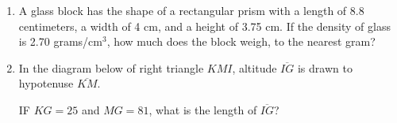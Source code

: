 \documentclass[12pt, oneside]{article}
\begin{document}
\begin{enumerate}[itemsep=2cm]
\item A glass block has the shape of a rectangular prism with a length of 8.8 centimeters, a width of 4 cm, and a height of 3.75 cm. If the density of glass is 2.70 grams/cm$^3$, how much does the block weigh, to the nearest gram?

\item In the diagram below of right triangle $KMI$, altitude $\overline{IG}$ is drawn to hypotenuse $\overline{KM}$.
  \begin{center}
  \end{center}
IF $KG=25$ and $MG=81$, what is the length of $\overline{IG}$?

\end{enumerate}
\end{document}
